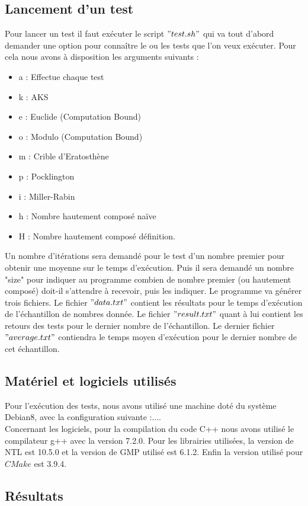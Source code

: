 		\subsection{Lancement d'un test}
	Pour lancer un test il faut exécuter le script $"test.sh"$ qui va tout d'abord demander une option pour connaître le ou les tests que l'on veux exécuter. Pour cela nous avons à disposition les arguments suivants : 
	\begin{itemize}
		\item a : Effectue chaque test
		\item k : AKS
		\item e : Euclide (Computation Bound)
		\item o : Modulo (Computation Bound)
		\item m : Crible d'Eratosthène
		\item p : Pocklington
		\item i : Miller-Rabin
		\item h : Nombre hautement composé naïve
		\item H : Nombre hautement composé définition.
	\end{itemize}
	
Un nombre d'itérations sera demandé pour le test d'un nombre premier pour obtenir une moyenne sur le temps d'exécution. Puis il sera demandé un nombre "size" pour indiquer au programme combien de nombre premier (ou hautement composé) doit-il s'attendre à recevoir, puis les indiquer. Le programme va générer trois fichiers. Le fichier $"data.txt"$ contient les résultats pour le temps d'exécution de l'échantillon de nombres donnée. Le fichier $"result.txt"$ quant à lui contient les retours des tests pour le dernier nombre de l'échantillon. Le dernier fichier $"average.txt"$ contiendra le temps moyen d'exécution pour le dernier nombre de cet échantillon.
		\subsection{Matériel et logiciels utilisés}
		Pour l'exécution des tests, nous avons utilisé une machine doté du système Debian8, avec la configuration suivante :....\\
		Concernant les logiciels, pour la compilation du code C++ nous avons utilisé le compilateur g++ avec la version 7.2.0. Pour les librairies utilisées, la version de NTL est 10.5.0 et la version de GMP utilisé est 6.1.2. Enfin la version utilisé pour $CMake$ est 3.9.4.
			
		\subsection{Résultats} 		
